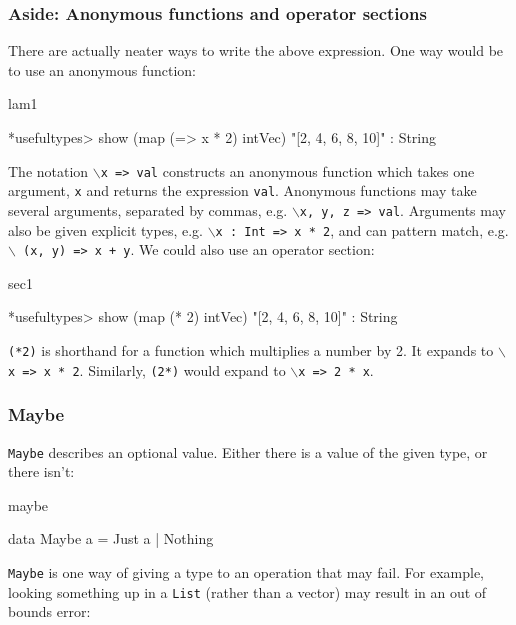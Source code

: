\subsubsection*{Aside: Anonymous functions and operator sections}

There are actually neater ways to write the above expression. One way would be
to use an anonymous function:

\begin{SaveVerbatim}{lam1}

*usefultypes> show (map (\x => x * 2) intVec)
"[2, 4, 6, 8, 10]" : String

\end{SaveVerbatim}

\noindent
The notation \texttt{$\backslash$x => val} constructs an anonymous function
which takes one argument, \texttt{x} and returns the expression \texttt{val}.
Anonymous functions may take several arguments, separated by commas, e.g.
\texttt{$\backslash$x, y, z => val}. Arguments may also be given explicit
types, e.g. \texttt{$\backslash$x : Int => x * 2}, and can pattern match,
e.g. \texttt{$\backslash$ (x, y) => x + y}.
We could also use an operator section:

\begin{SaveVerbatim}{sec1}

*usefultypes> show (map (* 2) intVec)
"[2, 4, 6, 8, 10]" : String

\end{SaveVerbatim}

\noindent
\texttt{(*2)} is shorthand for a function which multiplies a number by 2. It expands to
\texttt{$\backslash$x => x * 2}. 
Similarly, \texttt{(2*)} would expand to \texttt{$\backslash$x => 2 * x}.

\subsubsection{Maybe}

\texttt{Maybe} describes an optional value. Either there is a value of the given type,
or there isn't:

\begin{SaveVerbatim}{maybe}

data Maybe a = Just a | Nothing

\end{SaveVerbatim}

\noindent
\texttt{Maybe} is one way of giving a type to an operation that may fail. For example,
looking something up in a \texttt{List} (rather than a vector) may result in an out of
bounds error:

